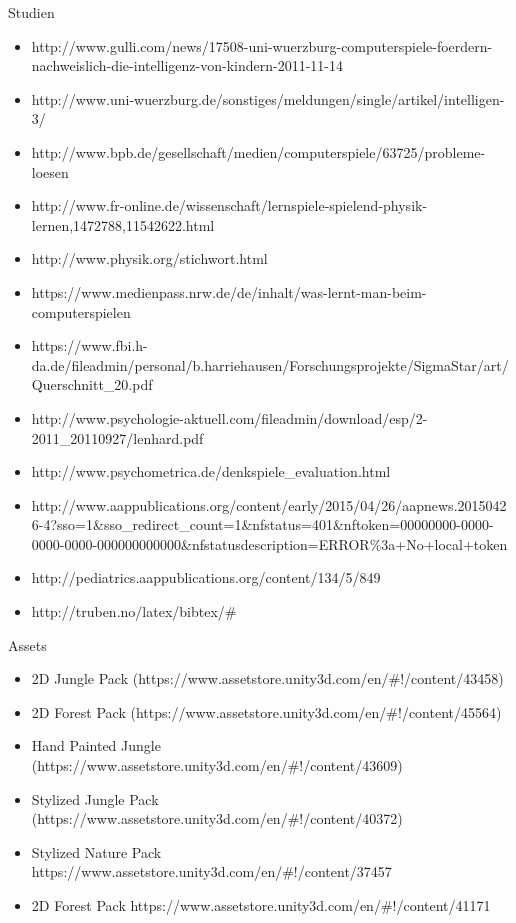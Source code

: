 Studien
\begin{itemize}
\item \circledmark\quad http://www.gulli.com/news/17508-uni-wuerzburg-computerspiele-foerdern-nachweislich-die-intelligenz-von-kindern-2011-11-14
\item \circledmark\quad http://www.uni-wuerzburg.de/sonstiges/meldungen/single/artikel/intelligen-3/
\item \circledmark\quad http://www.bpb.de/gesellschaft/medien/computerspiele/63725/probleme-loesen
\item \circledmark\quad http://www.fr-online.de/wissenschaft/lernspiele-spielend-physik-lernen,1472788,11542622.html
\item http://www.physik.org/stichwort.html
\item \circledmark\quad https://www.medienpass.nrw.de/de/inhalt/was-lernt-man-beim-computerspielen
\item https://www.fbi.h-da.de/fileadmin/personal/b.harriehausen/Forschungsprojekte/SigmaStar/art/Querschnitt\_20.pdf
\item \circledmark\quad http://www.psychologie-aktuell.com/fileadmin/download/esp/2-2011\_20110927/lenhard.pdf
\item \circledmark\quad http://www.psychometrica.de/denkspiele\_evaluation.html
\item \circledmark\quad http://www.aappublications.org/content/early/2015/04/26/aapnews.20150426-4?sso=1\&sso\_redirect\_count=1\&nfstatus=401\&nftoken=00000000-0000-0000-0000-000000000000\&nfstatusdescription=ERROR\%3a+No+local+token
\item \circledmark\quad http://pediatrics.aappublications.org/content/134/5/849
\item http://truben.no/latex/bibtex/\#
\end{itemize}


Assets
\begin{itemize}
\item 2D Jungle Pack (https://www.assetstore.unity3d.com/en/\#!/content/43458)
\item 2D Forest Pack (https://www.assetstore.unity3d.com/en/\#!/content/45564)
\item Hand Painted Jungle (https://www.assetstore.unity3d.com/en/\#!/content/43609)
\item Stylized Jungle Pack (https://www.assetstore.unity3d.com/en/\#!/content/40372)
\item Stylized Nature Pack 
https://www.assetstore.unity3d.com/en/\#!/content/37457
\item 2D Forest Pack
https://www.assetstore.unity3d.com/en/\#!/content/41171
\end{itemize}

\newpage